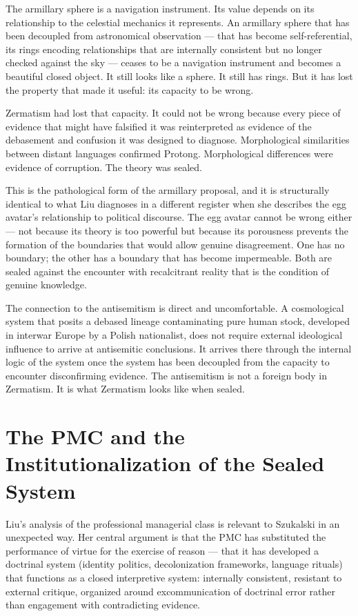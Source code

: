 \documentclass[11pt, a4paper]{article}
\theoremstyle{named}
\begin{document}
The armillary sphere is a navigation instrument. Its value depends on
its relationship to the celestial mechanics it represents. An armillary
sphere that has been decoupled from astronomical observation — that
has become self-referential, its rings encoding relationships that
are internally consistent but no longer checked against the sky —
ceases to be a navigation instrument and becomes a beautiful closed
object. It still looks like a sphere. It still has rings. But it has
lost the property that made it useful: its capacity to be wrong.

Zermatism had lost that capacity. It could not be wrong because
every piece of evidence that might have falsified it was
reinterpreted as evidence of the debasement and confusion it was
designed to diagnose. Morphological similarities between distant
languages confirmed Protong. Morphological differences were evidence
of corruption. The theory was sealed.

This is the pathological form of the armillary proposal, and it is
structurally identical to what Liu diagnoses in a different register
when she describes the egg avatar's relationship to political
discourse. The egg avatar cannot be wrong either — not because its
theory is too powerful but because its porousness prevents the
formation of the boundaries that would allow genuine disagreement.
One has no boundary; the other has a boundary that has become
impermeable. Both are sealed against the encounter with recalcitrant
reality that is the condition of genuine knowledge.

The connection to the antisemitism is direct and uncomfortable.
A cosmological system that posits a debased lineage contaminating
pure human stock, developed in interwar Europe by a Polish nationalist,
does not require external ideological influence to arrive at
antisemitic conclusions. It arrives there through the internal logic
of the system once the system has been decoupled from the capacity
to encounter disconfirming evidence. The antisemitism is not a foreign
body in Zermatism. It is what Zermatism looks like when sealed.

\section{The PMC and the Institutionalization of the Sealed System}

Liu's analysis of the professional managerial class is relevant to
Szukalski in an unexpected way. Her central argument is that the PMC
has substituted the performance of virtue for the exercise of reason —
that it has developed a doctrinal system (identity politics,
decolonization frameworks, language rituals) that functions as a
closed interpretive system: internally consistent, resistant to
external critique, organized around excommunication of doctrinal
error rather than engagement with contradicting evidence.
\end{document}
